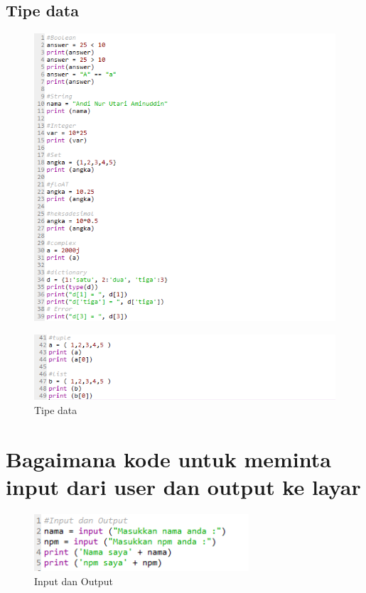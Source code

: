 \subsection{Tipe data}
    \begin{figure}[!htbp]
        \centering
        \includegraphics[width=15cm]{figures/tipedata.PNG}
    \end{figure}
        \begin{figure}[!htbp]
        \centering
        \includegraphics[width=15cm]{figures/tipedata2.PNG}
        \caption{Tipe data}
    \end{figure}
\newpage
\section{Bagaimana kode untuk meminta input dari user dan output ke layar}
    \begin{figure}[!htbp]
        \centering
        \includegraphics[width=8cm]{figures/inputdanoutput.PNG}
        \caption{Input dan Output}
        \label{}
    \end{figure}
